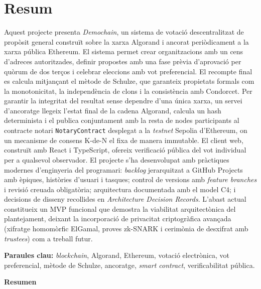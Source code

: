 

\chapter*{Resum}

Aquest projecte presenta \emph{Demochain}, un sistema de votació
descentralitzat de propòsit general construït sobre la xarxa Algorand i
ancorat periòdicament a la xarxa pública Ethereum. El sistema permet
crear organitzacions amb un cens d'adreces autoritzades, definir
propostes amb una fase prèvia d'aprovació per quòrum de dos terços i
celebrar eleccions amb vot preferencial. El recompte final es calcula
mitjançant el mètode de Schulze, que garanteix propietats formals com la
monotonicitat, la independència de clons i la consistència amb
Condorcet. Per garantir la integritat del resultat sense dependre d'una
única xarxa, un servei d'ancoratge llegeix l'estat final de la cadena
Algorand, calcula un hash determinista i el publica conjuntament amb la
resta de nodes participants al contracte notari \texttt{NotaryContract}
desplegat a la \emph{testnet} Sepolia d'Ethereum, on un mecanisme de
consens K-de-N el fixa de manera immutable. El client web, construït
amb React i TypeScript, ofereix verificació pública del vot
individual per a qualsevol observador. El projecte s'ha desenvolupat amb
pràctiques modernes d'enginyeria del programari: \emph{backlog}
jerarquitzat a GitHub Projects amb èpiques, històries d'usuari i
tasques; control de versions amb \emph{feature branches} i revisió
creuada obligatòria; arquitectura documentada amb el model C4; i
decisions de disseny recollides en \emph{Architecture Decision Records}.
L'abast actual constitueix un MVP funcional que demostra la viabilitat
arquitectònica del plantejament, deixant la incorporació de privacitat
criptogràfica avançada (xifratge homomòrfic ElGamal, proves zk-SNARK i
cerimònia de desxifrat amb \emph{trustees}) com a treball futur.

\textbf{Paraules clau:} \emph{blockchain}, Algorand, Ethereum, votació
electrònica, vot preferencial, mètode de Schulze, ancoratge,
\emph{smart contract}, verificabilitat pública.

\vspace{1cm}
\begin{center}\textbf{\Large Resumen}\end{center}
\vspace{0.5cm}

